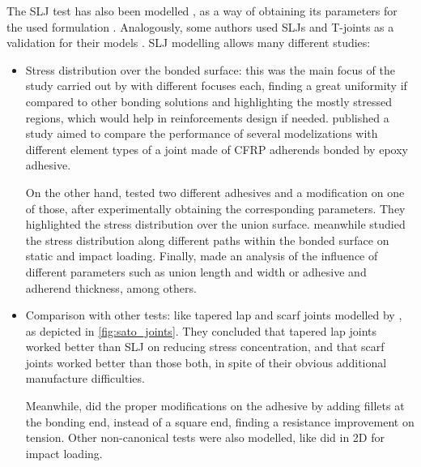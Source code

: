 \documentclass[
documentsize = a4, %
font = cmr, %
typesize = 11, %
printmode = true,
onehalfspacing = true,
language = en, %
titlepage = udciccp, %
degree = pt, %
dedication = true,
acknowledgements = true,
abstract-en = true,
abstract-es = false,
abstract-ga = false,
epigraphs = true,
toc = true,
lof = true,
lot = true,
frontmatterintoc = false,
notation = false,
minimal = false,
]{UDCthesis}
\begin{document}
The \gls{SLJ} test has also been modelled \citep{Vaidya2006}, as a way of obtaining its parameters for the used formulation \citep{Scattina2011}. Analogously, some authors used \glspl{SLJ} and T-joints as a validation for their models \citep{Loureiro2010, Liao2011}. \Gls{SLJ} modelling allows many different studies:
\begin{itemize}
	\item Stress distribution over the bonded surface: this was the main focus of the study carried out by \citet{Vaidya2006, Liao2011, Hazimeh2014} with different focuses each, finding a great uniformity if compared to other bonding solutions and highlighting the mostly stressed regions, which would help in reinforcements design if needed. \citet{diaz2010benchmarking} published a study aimed to compare the performance of several modelizations with different element types of a joint made of CFRP adherends bonded by  epoxy  adhesive.

	On the other hand, \citet{Vaidya2006} tested two different adhesives and a modification on one of those, after experimentally obtaining the corresponding parameters. They highlighted the stress distribution over the union surface. \citet{Liao2011} meanwhile studied the stress distribution along different paths within the bonded surface on static and impact loading. Finally, \citet{Hazimeh2014} made an analysis of the influence of different parameters such as union length and width or adhesive and adherend thickness, among others.

	\item Comparison with other tests: like tapered lap and scarf joints modelled by \citet{Sato2000}, as depicted in \cref{fig:sato_joints}. They concluded that tapered lap joints worked better than \gls{SLJ} on reducing stress concentration, and that scarf joints worked better than those both, in spite of their obvious additional manufacture difficulties.

	Meanwhile, \citet{Grant2009} did the proper modifications on the adhesive by adding fillets at the bonding end, instead of a square end, finding a resistance improvement on tension. Other non-canonical tests were also modelled, like \citet{Kihara2003} did in 2D for impact loading.


\end{itemize}
\end{document}
